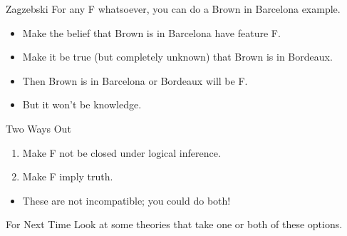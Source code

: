 \documentclass[
  17pt,
  letterpaper,
  ignorenonframetext,
  aspectratio=169,
]{beamer}
\providecommand{\tightlist}{%
  \setlength{\itemsep}{0pt}\setlength{\parskip}{0pt}}\usepackage{longtable,booktabs,array}
\begin{document}
\begin{frame}{Zagzebski}
\protect\hypertarget{zagzebski-1}{}
For any F whatsoever, you can do a Brown in Barcelona example.

\begin{itemize}[<+->]
\tightlist
\item
  Make the belief that Brown is in Barcelona have feature F.
\item
  Make it be true (but completely unknown) that Brown is in Bordeaux.
\item
  Then Brown is in Barcelona or Bordeaux will be F.
\item
  But it won't be knowledge.
\end{itemize}
\end{frame}

\begin{frame}{Two Ways Out}
\protect\hypertarget{two-ways-out}{}
\begin{enumerate}[<+->]
\tightlist
\item
  Make F not be closed under logical inference.
\item
  Make F imply truth.
\end{enumerate}

\begin{itemize}[<+->]
\tightlist
\item
  These are not incompatible; you could do both!
\end{itemize}
\end{frame}

\begin{frame}{For Next Time}
\protect\hypertarget{for-next-time}{}
Look at some theories that take one or both of these options.
\end{frame}
\end{document}
